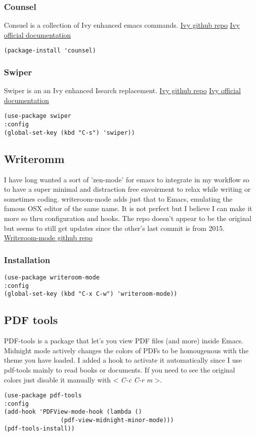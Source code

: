 \documentclass[11pt]{article}
\begin{document}
\subsubsection{Counsel}
\label{sec:org86f90c1}
Consuel is a collection of Ivy enhanced emacs commands.
\href{https://github.com/Microsoft/ivy}{Ivy github repo}
\href{https://oremacs.com/swiper/}{Ivy official documentation}
\begin{verbatim}
(package-install 'counsel)
\end{verbatim}

\subsubsection{Swiper}
\label{sec:org50c6d66}
Swiper is an an Ivy enhanced Isearch replacement.
\href{https://github.com/Microsoft/ivy}{Ivy github repo}
\href{https://oremacs.com/swiper/}{Ivy official documentation}
\begin{verbatim}
(use-package swiper
:config
(global-set-key (kbd "C-s") 'swiper))
\end{verbatim}
\subsection{Writeromm}
\label{sec:org5343520}
I have long wanted a sort of 'zen-mode' for emacs to integrate in my workflow so to have a super minimal and distraction free envoirment to relax while writing or sometimes coding.
writeroom-mode adds just that to Emacs, emulating the famous OSX editor of the same name. It is not perfect but I believe I can make it more so thru configuration and hooks.
The repo doesn't appear to be the original but seems to still get updates since the other's last commit is from 2015.
\href{https://github.com/joostkremers/writeroom-mode}{Writeroom-mode github repo}
\subsubsection{Installation}
\label{sec:orge4a5a54}
\begin{verbatim}
(use-package writeroom-mode
:config
(global-set-key (kbd "C-x C-w") 'writeroom-mode))
\end{verbatim}

\subsection{PDF tools}
\label{sec:org4647413}
PDF-tools is a package that let's you view PDF files (and more) inside Emacs.
Midnight mode actively changes the colors of PDFs to be homougenous with the theme you have loaded. 
I added a hook to activate it automatically since I use pdf-tools mainly to read books or documents. If you need to see the original colors just disable it manually with < \emph{C-c C-r m} >.
\begin{verbatim}
(use-package pdf-tools
:config
(add-hook 'PDFView-mode-hook (lambda ()
				(pdf-view-midnight-minor-mode)))
(pdf-tools-install))
\end{verbatim}
\end{document}
